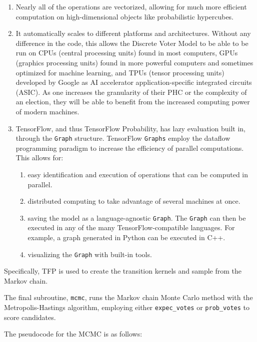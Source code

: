 \begin{enumerate}
  \item Nearly all of the operations are vectorized, allowing for much more efficient computation on high-dimensional objects like probabilistic hypercubes.
  \item It automatically scales to different platforms and architectures. Without any difference in the code, this allows the Discrete Voter Model to be able to be run on CPUs (central processing units) found in most computers, GPUs (graphics processing units) found in more powerful computers and sometimes optimized for machine learning, and TPUs (tensor processing units) developed by Google as AI accelerator application-specific integrated circuits (ASIC). As one increases the granularity of their PHC or the complexity of an election, they will be able to benefit from the increased computing power of modern machines.
  \item TensorFlow, and thus TensorFlow Probability, has lazy evaluation built in, through the \texttt{Graph} structure. TensorFlow \texttt{Graphs} employ the dataflow programming paradigm to increase the efficiency of parallel computations.\cite{tf_graph} This allows for:
  \begin{enumerate}
    \item easy identification and execution of operations that can be computed in parallel.
    \item distributed computing to take advantage of several machines at once.
    \item saving the model as a language-agnostic \texttt{Graph}. The \texttt{Graph} can then be executed in any of the many TensorFlow-compatible languages. For example, a graph generated in Python can be executed in C++.
    \item visualizing the \texttt{Graph} with built-in tools.
  \end{enumerate}
\end{enumerate}

Specifically, TFP is used to create the transition kernels and sample from the Markov chain.


The final subroutine, \texttt{mcmc}, runs the Markov chain Monte Carlo method with the Metropolis-Hastings algorithm, employing either \texttt{expec\_votes} or \texttt{prob\_votes} to score candidates.

The pseudocode for the MCMC is as follows:

